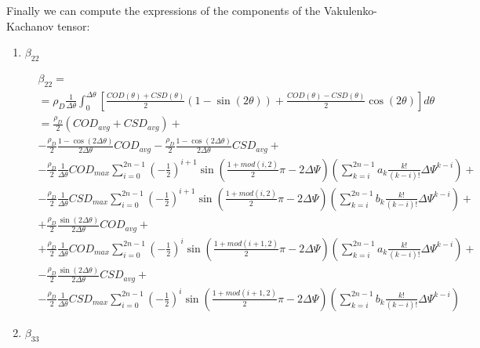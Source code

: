 \documentclass[review]{elsarticle}
\begin{document}
Finally we can compute the expressions of the components of the Vakulenko-Kachanov tensor:

\begin{enumerate}
\item $\beta_{22}$

\begin{equation}
\begin{aligned}
&\beta_{22}=\\
&=\rho_{D}\frac{1}{\Delta\theta}\int_{0}^{\Delta\theta}\left[\frac{COD\left(\theta\right)+CSD\left(\theta\right)}{2}\left(1-\sin\left(2\theta\right)\right)+\frac{COD\left(\theta\right)-CSD\left(\theta\right)}{2}\cos\left(2\theta\right)\right]d\theta\\
&=\frac{\rho_{D}}{2}\left(COD_{avg}+CSD_{avg}\right)+\\
&-\frac{\rho_{D}}{2}\frac{1-\cos\left(2\Delta\theta\right)}{2\Delta\theta}COD_{avg}-\frac{\rho_{D}}{2}\frac{1-\cos\left(2\Delta\theta\right)}{2\Delta\theta}CSD_{avg}+\\
&-\frac{\rho_{D}}{2}\frac{1}{\Delta\theta}COD_{max}\sum_{i=0}^{2n-1}\left(-\frac{1}{2}\right)^{i+1}\sin(\frac{1+mod\left(i,2\right)}{2}\pi-2\Delta\Psi)\left(\sum_{k=i}^{2n-1}a_{k}\frac{k!}{\left(k-i\right)!}\Delta\Psi^{k-i}\right)+\\
&-\frac{\rho_{D}}{2}\frac{1}{\Delta\theta}CSD_{max}\sum_{i=0}^{2n-1}\left(-\frac{1}{2}\right)^{i+1}\sin(\frac{1+mod\left(i,2\right)}{2}\pi-2\Delta\Psi)\left(\sum_{k=i}^{2n-1}b_{k}\frac{k!}{\left(k-i\right)!}\Delta\Psi^{k-i}\right)+\\
&+\frac{\rho_{D}}{2}\frac{\sin\left(2\Delta\theta\right)}{2\Delta\theta}COD_{avg}+\\
&+\frac{\rho_{D}}{2}\frac{1}{\Delta\theta}COD_{max}\sum_{i=0}^{2n-1}\left(-\frac{1}{2}\right)^{i}\sin(\frac{1+mod\left(i+1,2\right)}{2}\pi-2\Delta\Psi)\left(\sum_{k=i}^{2n-1}a_{k}\frac{k!}{\left(k-i\right)!}\Delta\Psi^{k-i}\right)+\\
&-\frac{\rho_{D}}{2}\frac{\sin\left(2\Delta\theta\right)}{2\Delta\theta}CSD_{avg}+\\
&-\frac{\rho_{D}}{2}\frac{1}{\Delta\theta}CSD_{max}\sum_{i=0}^{2n-1}\left(-\frac{1}{2}\right)^{i}\sin(\frac{1+mod\left(i+1,2\right)}{2}\pi-2\Delta\Psi)\left(\sum_{k=i}^{2n-1}b_{k}\frac{k!}{\left(k-i\right)!}\Delta\Psi^{k-i}\right)
\end{aligned}
\end{equation}

\item $\beta_{33}$


\end{enumerate}
\end{document}
